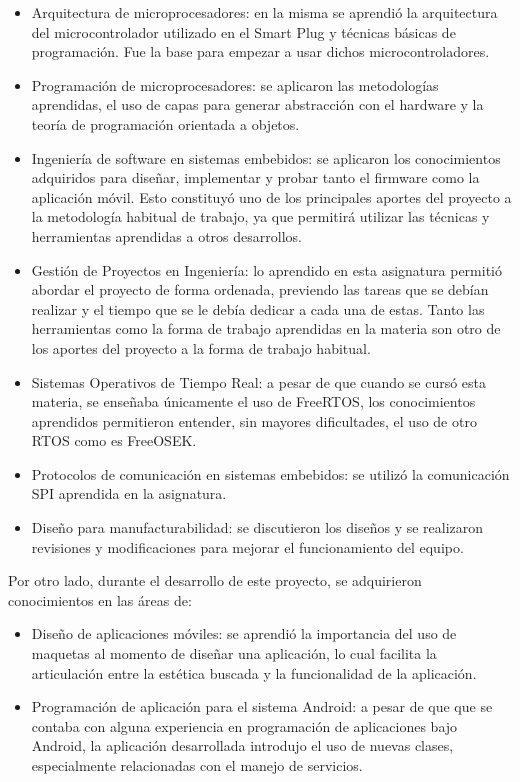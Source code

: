 \begin{itemize}
\item Arquitectura de microprocesadores: en la misma se aprendió la arquitectura del microcontrolador utilizado en el Smart Plug y técnicas básicas de programación. Fue la base para empezar a usar dichos microcontroladores.
\item Programación de microprocesadores: se aplicaron las metodologías aprendidas, el uso de capas para generar abstracción con el hardware y la teoría de programación orientada a objetos.
\item Ingeniería de software en sistemas embebidos: se aplicaron los conocimientos adquiridos para diseñar, implementar y probar tanto el firmware como la aplicación móvil. Esto constituyó uno de los principales aportes del proyecto a la metodología habitual de trabajo, ya que permitirá utilizar las técnicas y herramientas aprendidas a otros desarrollos.
\item Gestión de Proyectos en Ingeniería: lo aprendido en esta asignatura permitió abordar el proyecto de forma ordenada, previendo las tareas  que se debían realizar y el tiempo que se le debía dedicar a cada una de estas. Tanto las herramientas como la forma de trabajo aprendidas en la materia son otro de los aportes del proyecto a la forma de trabajo habitual.
\item Sistemas Operativos de Tiempo Real: a pesar de que cuando se cursó esta materia, se enseñaba únicamente el uso de FreeRTOS, los conocimientos aprendidos permitieron entender, sin mayores dificultades, el uso de otro RTOS como es FreeOSEK.
\item Protocolos de comunicación en sistemas embebidos: se utilizó la comunicación SPI aprendida en la asignatura.
\item Diseño para manufacturabilidad: se discutieron los diseños y se realizaron revisiones y modificaciones para mejorar el funcionamiento del equipo.
\end{itemize}


Por otro lado, durante el desarrollo de este proyecto, se adquirieron conocimientos en las áreas de:

\begin{itemize}
\item Diseño de aplicaciones móviles: se aprendió la importancia del uso de maquetas al momento de diseñar una aplicación, lo cual facilita la articulación entre la estética buscada y la funcionalidad de la aplicación.
\item Programación de aplicación para el sistema Android: a pesar de que que se contaba con alguna experiencia en programación de aplicaciones bajo Android, la aplicación desarrollada introdujo el uso de nuevas clases, especialmente relacionadas con el manejo de servicios.
\end{itemize}



